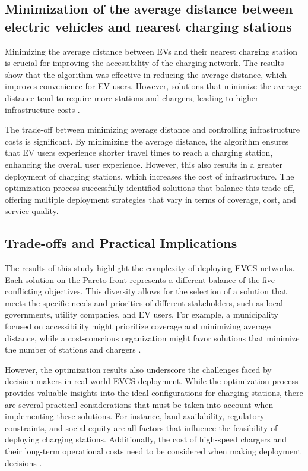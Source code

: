 \subsection{Minimization of the average distance between electric vehicles and nearest charging stations}

Minimizing the average distance between EVs and their nearest charging station is crucial for improving the accessibility of the charging network. The results show that the algorithm was effective in reducing the average distance, which improves convenience for EV users. However, solutions that minimize the average distance tend to require more stations and chargers, leading to higher infrastructure costs \citep{A multi-objective optimization model for electric vehicle charging station location planning}.

The trade-off between minimizing average distance and controlling infrastructure costs is significant. By minimizing the average distance, the algorithm ensures that EV users experience shorter travel times to reach a charging station, enhancing the overall user experience. However, this also results in a greater deployment of charging stations, which increases the cost of infrastructure. The optimization process successfully identified solutions that balance this trade-off, offering multiple deployment strategies that vary in terms of coverage, cost, and service quality.

\subsection{Trade-offs and Practical Implications}

The results of this study highlight the complexity of deploying EVCS networks. Each solution on the Pareto front represents a different balance of the five conflicting objectives. This diversity allows for the selection of a solution that meets the specific needs and priorities of different stakeholders, such as local governments, utility companies, and EV users. For example, a municipality focused on accessibility might prioritize coverage and minimizing average distance, while a cost-conscious organization might favor solutions that minimize the number of stations and chargers \citep{A multi-objective optimization model for electric vehicle charging station location planning}.

However, the optimization results also underscore the challenges faced by decision-makers in real-world EVCS deployment. While the optimization process provides valuable insights into the ideal configurations for charging stations, there are several practical considerations that must be taken into account when implementing these solutions. For instance, land availability, regulatory constraints, and social equity are all factors that influence the feasibility of deploying charging stations. Additionally, the cost of high-speed chargers and their long-term operational costs need to be considered when making deployment decisions \citep{A genetic algorithm-based optimization for the location of electric vehicle charging stations}.

